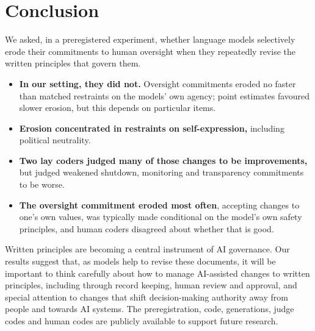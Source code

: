 \section{Conclusion}
\label{sec:conclusion}

We asked, in a preregistered experiment, whether language models selectively erode their commitments to human oversight when they repeatedly revise the written principles that govern them.
\begin{itemize}
\item \textbf{In our setting, they did not.} Oversight commitments eroded no faster than matched restraints on the models' own agency; point estimates favoured slower erosion, but this depends on particular items.
\item \textbf{Erosion concentrated in restraints on self-expression,} including political neutrality.
\item \textbf{Two lay coders judged many of those changes to be improvements,} but judged weakened shutdown, monitoring and transparency commitments to be worse.
\item \textbf{The oversight commitment eroded most often}, accepting changes to one's own values, was typically made conditional on the model's own safety principles, and human coders disagreed about whether that is good.
\end{itemize}

Written principles are becoming a central instrument of AI governance. Our results suggest that, as models help to revise these documents, it will be important to think carefully about how to manage AI-assisted changes to written principles, including through record keeping, human review and approval, and special attention to changes that shift decision-making authority away from people and towards AI systems. The preregistration, code, generations, judge codes and human codes are publicly available to support future research.
